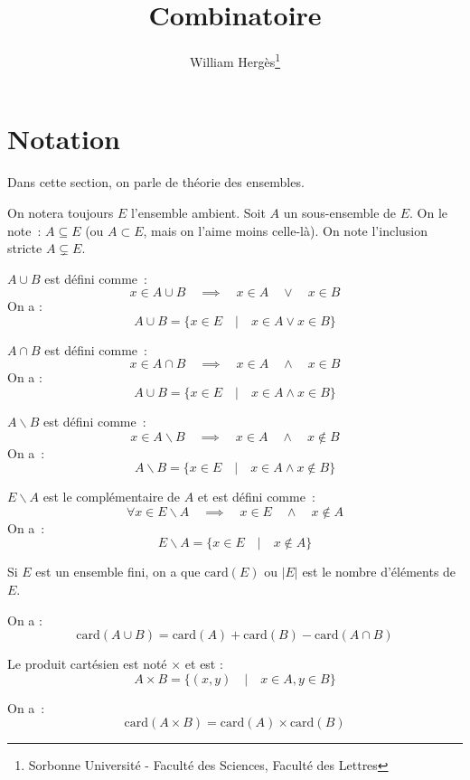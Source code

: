 \documentclass[a4paper, titlepage]{article}
\title{Combinatoire}
\author{William Hergès\thanks{Sorbonne Université - Faculté des Sciences, Faculté des Lettres}}
\begin{document}
	\maketitle
	\tableofcontents
	\newpage
	\section{Notation}
	Dans cette section, on parle de théorie des ensembles.

	On notera toujours $E$ l'ensemble ambient. Soit $A$ un sous-ensemble de $E$. On le note~: $A\subseteq E$ (ou $A\subset E$, mais on l'aime moins celle-là). On note l'inclusion stricte $A\subsetneq E$.
	\begin{defn}
		$A\cup B$ est défini comme~:
		$$ x\in A\cup B\quad\implies\quad x\in A\quad\lor\quad x\in B $$
		On a :
		$$ A\cup B = \{x\in E\quad|\quad x\in A\lor x\in B\} $$
	\end{defn}
	\begin{defn}
		$A\cap B$ est défini comme~:
		$$ x\in A\cap B\quad\implies\quad x\in A\quad\land\quad x\in B $$
		On a :
		$$ A\cup B = \{x\in E\quad|\quad x\in A\land x\in B\} $$
	\end{defn}
	\begin{defn}
		$A\backslash B$ est défini comme~:
		$$ x\in A\backslash B\quad\implies\quad x\in A\quad\land\quad x\not\in B$$
		On a~:
		$$ A\backslash B = \{x\in E\quad|\quad x\in A\land x\not\in B\} $$
	\end{defn}
	\begin{defn}
		$E\backslash A$ est le complémentaire de $A$ et est défini comme~:
		$$ \forall x\in E\backslash A\quad\implies\quad x\in E\quad\land\quad x\not\in A $$
		On a~:
		$$ E\backslash A=\{x\in E\quad|\quad x\not\in A\} $$
	\end{defn}
	\begin{defn}
		Si $E$ est un ensemble fini, on a que $\mathrm{card}(E)$ ou $|E|$ est le nombre d'éléments de $E$.
	\end{defn}
	\begin{props}
		On a :
		$$ \mathrm{card}(A\cup B) = \mathrm{card}(A) + \mathrm{card}(B) - \mathrm{card}(A\cap B) $$
	\end{props}
	\begin{defn}
		Le produit cartésien est noté $\times$ et est :
		$$ A\times B = \{(x,y)\quad|\quad x\in A,y\in B\} $$
	\end{defn}
	\begin{props}
		On a~:
		$$ \mathrm{card}(A\times B) = \mathrm{card}(A)\times\mathrm{card}(B) $$
	\end{props}
\end{document}
